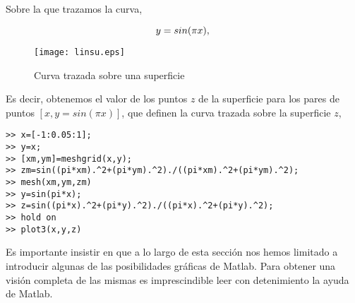 Sobre la que trazamos la curva,

\begin{equation*}
y=sin(\pi x),\\
\end{equation*}

\begin{figure}[h]
\centering
\texttt{[image: linsu.eps]}
\caption{Curva trazada sobre una superficie}
\label{fig:cvsurf}
\end{figure}

Es decir, obtenemos el valor de los puntos $z$ de la superficie para los pares de puntos $[x, y = sin(\pi x)]$, que definen la curva trazada sobre la superficie $z$,

\begin{verbatim}
>> x=[-1:0.05:1];
>> y=x;
>> [xm,ym]=meshgrid(x,y);
>> zm=sin((pi*xm).^2+(pi*ym).^2)./((pi*xm).^2+(pi*ym).^2);
>> mesh(xm,ym,zm)
>> y=sin(pi*x);
>> z=sin((pi*x).^2+(pi*y).^2)./((pi*x).^2+(pi*y).^2);
>> hold on
>> plot3(x,y,z)
\end{verbatim}

Es importante insistir en que a lo largo de esta sección nos hemos limitado a introducir algunas de las posibilidades gráficas de Matlab. Para obtener una visión completa de las mismas es imprescindible leer con detenimiento la ayuda de Matlab.

\newpage
